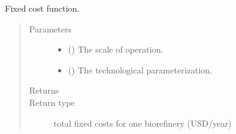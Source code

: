 \documentclass[letterpaper,10pt,english]{sphinxmanual}
\begin{document}
\begin{fulllineitems}
\label{\detokenize{technology:technology.tutorial_biorefinery.fixed_cost}}
Fixed cost function.
\begin{quote}\begin{description}
\item[{Parameters}] \leavevmode\begin{itemize}
\item {} 
 (\sphinxstyleliteralemphasis{\sphinxupquote{ {[}}}\sphinxstyleliteralemphasis{\sphinxupquote{{]}}}) \textendash{} The scale of operation.

\item {} 
 () \textendash{} The technological parameterization.

\end{itemize}

\item[{Returns}] \leavevmode


\item[{Return type}] \leavevmode
total fixed costs for one biorefinery (USD/year)

\end{description}\end{quote}

\end{fulllineitems}

\end{document}
